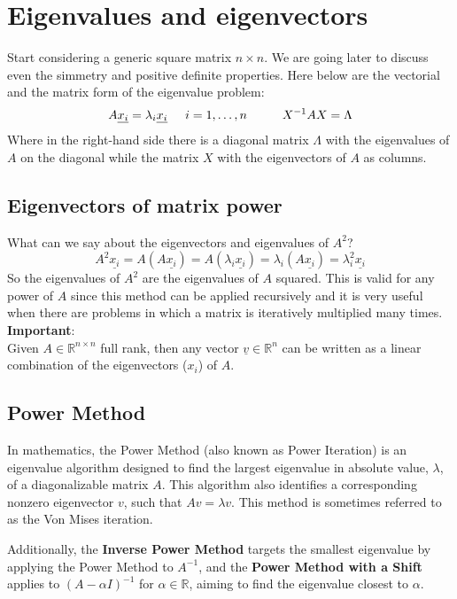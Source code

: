 
\section{Eigenvalues and eigenvectors}
Start considering a generic square matrix $n \times n$. We are going later to discuss even the simmetry and positive definite properties.
Here below are the vectorial and the matrix form of the eigenvalue problem:
\[
    A\underline{x_i} = \lambda_i\underline{x_i} \hspace{0.5cm} i = 1, \dots, n \hspace{1cm} X^{-1}AX = \Lambda
\]
Where in the right-hand side there is a diagonal matrix $\Lambda$ with the eigenvalues of $A$ on the diagonal while the matrix $X$ with the eigenvectors of $A$ as columns.\\

\subsection*{Eigenvectors of matrix power}
What can we say about the eigenvectors and eigenvalues of $A^2$?
\[
    A^2\underline{x_i} = A(A\underline{x_i}) = A(\lambda_i\underline{x_i}) = \lambda_i(A\underline{x_i}) = \lambda_i^2\underline{x_i}    
\]
So the eigenvalues of $A^2$ are the eigenvalues of $A$ squared. This is valid for any power of $A$ since this method can be applied recursively and it is very useful when there are problems in which a matrix is iteratively multiplied many times. \\

\textbf{Important}:\\
Given $A\in \mathbb{R}^{n\times n}$ full rank, then any vector $\underline{v} \in \mathbb{R}^n$ can be written as a linear combination of the eigenvectors ($x_i$) of $A$.\\
\subsection*{Power Method}
In mathematics, the Power Method (also known as Power Iteration) is an eigenvalue algorithm designed to find the largest eigenvalue in absolute value, \(\lambda\), of a diagonalizable matrix \(A\). This algorithm also identifies a corresponding nonzero eigenvector \(v\), such that \(Av = \lambda v\). This method is sometimes referred to as the Von Mises iteration.

Additionally, the \textbf{Inverse Power Method} targets the smallest eigenvalue by applying the Power Method to \(A^{-1}\), and the \textbf{Power Method with a Shift} applies to \((A - \alpha I)^{-1}\) for \(\alpha \in \mathbb{R}\), aiming to find the eigenvalue closest to \(\alpha\).

